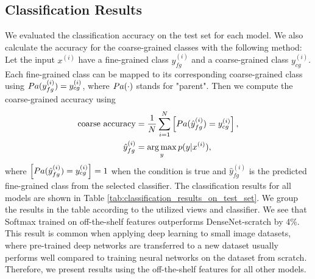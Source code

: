 \subsection{Classification Results}
\label{paperB:sec:classification_results}

We evaluated the classification accuracy on the test set for each model. We also calculate the accuracy for the coarse-grained classes with the following method: Let the input $x^{(i)}$ have a fine-grained class $y_{fg}^{(i)}$ and a coarse-grained class $y_{cg}^{(i)}$. Each fine-grained class can be mapped to its corresponding coarse-grained class using $Pa(y_{fg}^{(i)}) = y_{cg}^{(i)}$, where $Pa(\cdot)$ stands for "parent". Then we compute the coarse-grained accuracy using  
\begin{align}\label{eq:coarse_accuracy}
    \begin{split}
        \text{coarse accuracy} & = \frac{1}{N} \sum_{i=1}^{N} \left[ Pa(\hat{y}_{fg}^{(i)}) = y_{cg}^{(i)} \right], \\ 
        \hat{y}_{fg}^{(i)} & = \operatorname*{arg\,max}_{y} p(y | x^{(i)}),
    \end{split}
\end{align}
where $\left[ Pa(\hat{y}_{fg}^{(i)}) = y_{cg}^{(i)} \right] = 1$ when the condition is true and $\hat{y}_{fg}^{(i)}$ is the predicted fine-grained class from the selected classifier. The classification results for all models are shown in Table \ref{tab:classification_results_on_test_set}. We group the results in the table according to the utilized views and classifier. We see that Softmax trained on off-the-shelf features outperforms DenseNet-scratch by 4\%. This result is common when applying deep learning to small image datasets, where pre-trained deep networks are transferred to a new dataset usually performs well compared to training neural networks on the dataset from scratch. Therefore, we present results using the off-the-shelf features for all other models. 



